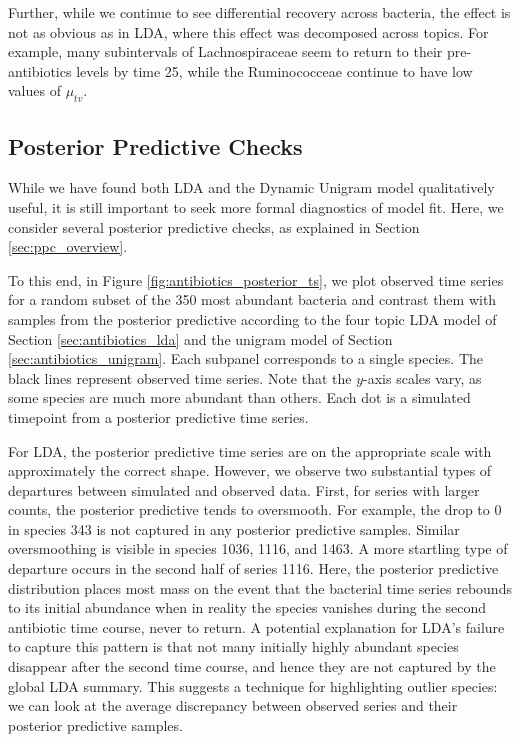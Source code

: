 \documentclass[oupdraft]{bio}
\begin{document}
{Further, while we continue to see differential recovery across bacteria, the
effect is not as obvious as in LDA, where this effect was decomposed across
topics. For example, many subintervals of Lachnospiraceae seem to return to
their pre-antibiotics levels by time 25, while the Ruminococceae continue to
have low values of $\mu_{tv}$.

\subsection{Posterior Predictive Checks}
\label{sec:antibiotics_ppc}

While we have found both LDA and the Dynamic Unigram model qualitatively useful,
it is still important to seek more formal diagnostics of model fit. Here, we
consider several posterior predictive checks, as explained in Section
\ref{sec:ppc_overview}.

To this end, in Figure \ref{fig:antibiotics_posterior_ts}, we plot observed time
series for a random subset of the 350 most abundant bacteria and contrast them
with samples from the posterior predictive according to the four topic LDA model
of Section \ref{sec:antibiotics_lda} and the unigram model of Section
\ref{sec:antibiotics_unigram}. Each subpanel corresponds to a single species. The
black lines represent observed time series. Note that the $y$-axis scales vary,
as some species are much more abundant than others. Each dot is a simulated
timepoint from a posterior predictive time series.

For LDA, the posterior predictive time series are on the appropriate scale with
approximately the correct shape. However, we observe two substantial types of
departures between simulated and observed data. First, for series with larger
counts, the posterior predictive tends to oversmooth. For example, the drop to 0
in species 343 is not captured in any posterior predictive samples. Similar
oversmoothing is visible in species 1036, 1116, and 1463. A more startling type of
departure occurs in the second half of series 1116. Here, the posterior
predictive distribution places most mass on the event that the bacterial time
series rebounds to its initial abundance when in reality the species vanishes
during the second antibiotic time course, never to return. A potential
explanation for LDA's failure to capture this pattern is that not many initially
highly abundant species disappear after the second time course, and hence they are
not captured by the global LDA summary. This suggests a technique for
highlighting outlier species: we can look at the average discrepancy between
observed series and their posterior predictive samples.

}
\end{document}
